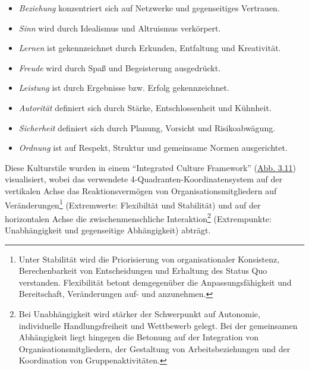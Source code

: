 \documentclass[
  letterpaper,
]{book}
\begin{document}
\begin{itemize}
\item
  \emph{Beziehung} konzentriert sich auf Netzwerke und gegenseitiges
  Vertrauen.
\item
  \emph{Sinn} wird durch Idealismus und Altruismus verkörpert.
\item
  \emph{Lernen} ist gekennzeichnet durch Erkunden, Entfaltung und
  Kreativität.
\item
  \emph{Freude} wird durch Spaß und Begeisterung ausgedrückt.
\item
  \emph{Leistung} ist durch Ergebnisse bzw. Erfolg gekennzeichnet.
\item
  \emph{Autorität} definiert sich durch Stärke, Entschlossenheit und
  Kühnheit.
\item
  \emph{Sicherheit} definiert sich durch Planung, Vorsicht und
  Risikoabwägung.
\item
  \emph{Ordnung} ist auf Respekt, Struktur und gemeinsame Normen
  ausgerichtet.
\end{itemize}

Diese Kulturstile wurden in einem ``Integrated Culture Framework''
(\hyperref[figure311]{Abb. 3.11}) visualisiert, wobei das verwendete
4-Quadranten-Koordinatensystem auf der vertikalen Achse das
Reaktionsvermögen von Organisationsmitgliedern auf
Veränderungen\footnote{Unter Stabilität wird die Priorisierung von
  organisationaler Konsistenz, Berechenbarkeit von Entscheidungen und
  Erhaltung des Status Quo verstanden. Flexibilität betont demgegenüber
  die Anpassungsfähigkeit und Bereitschaft, Veränderungen auf- und
  anzunehmen.} (Extremwerte: Flexibiltät und Stabilität) und auf der
horizontalen Achse die zwischenmenschliche Interaktion\footnote{Bei
  Unabhängigkeit wird stärker der Schwerpunkt auf Autonomie,
  individuelle Handlungsfreiheit und Wettbewerb gelegt. Bei der
  gemeinsamen Abhängigkeit liegt hingegen die Betonung auf der
  Integration von Organisationsmitgliedern, der Gestaltung von
  Arbeitsbeziehungen und der Koordination von Gruppenaktivitäten.}
(Extrempunkte: Unabhängigkeit und gegenseitige Abhängigkeit) abträgt.
\end{document}
